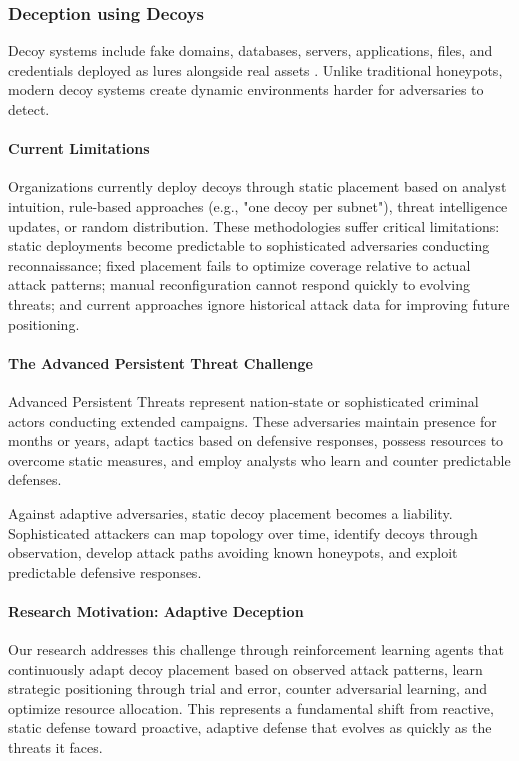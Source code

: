 \documentclass[12pt,oneside]{article}
\begin{document}
\clearpage

\subsubsection{Deception using Decoys} 

Decoy systems include fake domains, databases, servers, applications, files, and credentials deployed as lures alongside real assets \cite{zscaler2024deception}. Unlike traditional honeypots, modern decoy systems create dynamic environments harder for adversaries to detect.

\paragraph{Current Limitations} Organizations currently deploy decoys through static placement based on analyst intuition, rule-based approaches (e.g., "one decoy per subnet"), threat intelligence updates, or random distribution. These methodologies suffer critical limitations: static deployments become predictable to sophisticated adversaries conducting reconnaissance; fixed placement fails to optimize coverage relative to actual attack patterns; manual reconfiguration cannot respond quickly to evolving threats; and current approaches ignore historical attack data for improving future positioning.

\paragraph{The Advanced Persistent Threat Challenge} Advanced Persistent Threats represent nation-state or sophisticated criminal actors conducting extended campaigns. These adversaries maintain presence for months or years, adapt tactics based on defensive responses, possess resources to overcome static measures, and employ analysts who learn and counter predictable defenses.

Against adaptive adversaries, static decoy placement becomes a liability. Sophisticated attackers can map topology over time, identify decoys through observation, develop attack paths avoiding known honeypots, and exploit predictable defensive responses.

\paragraph{Research Motivation: Adaptive Deception} Our research addresses this challenge through reinforcement learning agents that continuously adapt decoy placement based on observed attack patterns, learn strategic positioning through trial and error, counter adversarial learning, and optimize resource allocation. This represents a fundamental shift from reactive, static defense toward proactive, adaptive defense that evolves as quickly as the threats it faces.
\end{document}
